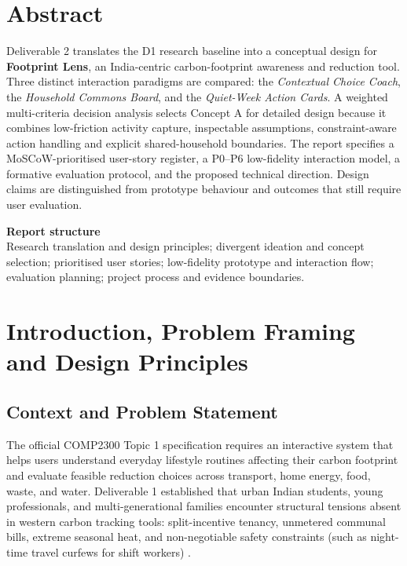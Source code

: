 \documentclass[12pt,a4paper]{article}
\begin{document}
\section*{Abstract}
Deliverable 2 translates the D1 research baseline into a conceptual design for \textbf{Footprint Lens}, an India-centric carbon-footprint awareness and reduction tool. Three distinct interaction paradigms are compared: the \emph{Contextual Choice Coach}, the \emph{Household Commons Board}, and the \emph{Quiet-Week Action Cards}. A weighted multi-criteria decision analysis selects Concept A for detailed design because it combines low-friction activity capture, inspectable assumptions, constraint-aware action handling and explicit shared-household boundaries. The report specifies a MoSCoW-prioritised user-story register, a P0--P6 low-fidelity interaction model, a formative evaluation protocol, and the proposed technical direction. Design claims are distinguished from prototype behaviour and outcomes that still require user evaluation.

\vspace{0.4cm}
\begin{keybox}
\textbf{\sffamily\color{Navy}Report structure}\\
Research translation and design principles; divergent ideation and concept selection; prioritised user stories; low-fidelity prototype and interaction flow; evaluation planning; project process and evidence boundaries.
\end{keybox}

\clearpage
\tableofcontents
\clearpage
{}
\setcounter{page}{1}

\section{Introduction, Problem Framing and Design Principles}

\subsection{Context and Problem Statement}
The official COMP2300 Topic 1 specification requires an interactive system that helps users understand everyday lifestyle routines affecting their carbon footprint and evaluate feasible reduction choices across transport, home energy, food, waste, and water. Deliverable 1 established that urban Indian students, young professionals, and multi-generational families encounter structural tensions absent in western carbon tracking tools: split-incentive tenancy, unmetered communal bills, extreme seasonal heat, and non-negotiable safety constraints (such as night-time travel curfews for shift workers) \cite{lee2021}. 
\end{document}
